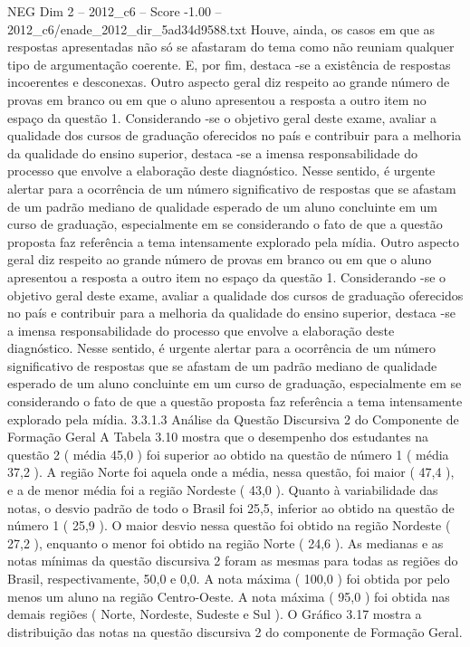 \begin{textsample}{NEG Dim 2 – 2012\_c6 – Score -1.00 – 2012\_c6/enade\_2012\_dir\_5ad34d9588.txt}
Houve, ainda, os casos em que as respostas apresentadas não só se afastaram do tema como não reuniam qualquer tipo de argumentação coerente.
E, por fim, destaca -se a existência de respostas incoerentes e desconexas.
Outro aspecto geral diz respeito ao grande número de provas em branco ou em que o aluno apresentou a resposta a outro item no espaço da questão 1.
Considerando -se o objetivo geral deste exame, avaliar a qualidade dos cursos de graduação oferecidos no país e contribuir para a melhoria da qualidade do ensino superior, destaca -se a imensa responsabilidade do processo que envolve a elaboração deste diagnóstico.
Nesse sentido, é urgente alertar para a ocorrência de um número significativo de respostas que se afastam de um padrão mediano de qualidade esperado de um aluno concluinte em um curso de graduação, especialmente em se considerando o fato de que a questão proposta faz referência a tema intensamente explorado pela mídia.
Outro aspecto geral diz respeito ao grande número de provas em branco ou em que o aluno apresentou a resposta a outro item no espaço da questão 1.
Considerando -se o objetivo geral deste exame, avaliar a qualidade dos cursos de graduação oferecidos no país e contribuir para a melhoria da qualidade do ensino superior, destaca -se a imensa responsabilidade do processo que envolve a elaboração deste diagnóstico.
Nesse sentido, é urgente alertar para a ocorrência de um número significativo de respostas que se afastam de um padrão mediano de qualidade esperado de um aluno concluinte em um curso de graduação, especialmente em se considerando o fato de que a questão proposta faz referência a tema intensamente explorado pela mídia. 3.3.1.3 Análise da Questão Discursiva 2 do Componente de Formação Geral A Tabela 3.10 mostra que o desempenho dos estudantes na questão 2 ( média 45,0 ) foi superior ao obtido na questão de número 1 ( média 37,2 ).
A região Norte foi aquela onde a média, nessa questão, foi maior ( 47,4 ), e a de menor média foi a região Nordeste ( 43,0 ).
Quanto à variabilidade das notas, o desvio padrão de todo o Brasil foi 25,5, inferior ao obtido na questão de número 1 ( 25,9 ).
O maior desvio nessa questão foi obtido na região Nordeste ( 27,2 ), enquanto o menor foi obtido na região Norte ( 24,6 ).
As medianas e as notas mínimas da questão discursiva 2 foram as mesmas para todas as regiões do Brasil, respectivamente, 50,0 e 0,0.
A nota máxima ( 100,0 ) foi obtida por pelo menos um aluno na região Centro-Oeste.
A nota máxima ( 95,0 ) foi obtida nas demais regiões ( Norte, Nordeste, Sudeste e Sul ).
O Gráfico 3.17 mostra a distribuição das notas na questão discursiva 2 do componente de Formação Geral.

\end{textsample}
